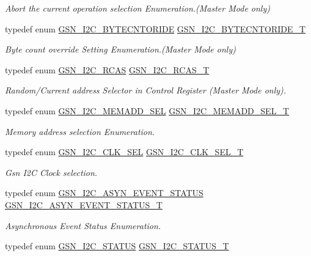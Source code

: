 \begin{DoxyCompactItemize}
\begin{DoxyCompactList}\small\item\em Abort the current operation selection Enumeration.(Master Mode only) \end{DoxyCompactList}\item 
typedef enum \hyperlink{a00649_ga47ecffee533c3e8638337fb1c33feb17}{GSN\_\-I2C\_\-BYTECNTORIDE} \hyperlink{a00649_ga3201b324d6b787d61766a854c7a8702a}{GSN\_\-I2C\_\-BYTECNTORIDE\_\-T}
\begin{DoxyCompactList}\small\item\em Byte count override Setting Enumeration.(Master Mode only) \end{DoxyCompactList}\item 
typedef enum \hyperlink{a00649_ga714a31fb514e9a5d07a62aadef7cc5f8}{GSN\_\-I2C\_\-RCAS} \hyperlink{a00649_ga3e0976c06462690937465a53a0c38cc4}{GSN\_\-I2C\_\-RCAS\_\-T}
\begin{DoxyCompactList}\small\item\em Random/Current address Selector in Control Register (Master Mode only). \end{DoxyCompactList}\item 
typedef enum \hyperlink{a00649_gaad8f0d778e6fcb233fd5644b770b504e}{GSN\_\-I2C\_\-MEMADD\_\-SEL} \hyperlink{a00649_ga3c8e92172b940c58950060ddbccee36d}{GSN\_\-I2C\_\-MEMADD\_\-SEL\_\-T}
\begin{DoxyCompactList}\small\item\em Memory address selection Enumeration. \end{DoxyCompactList}\item 
typedef enum \hyperlink{a00649_gac428b668a257595f28f3daf1789b22ae}{GSN\_\-I2C\_\-CLK\_\-SEL} \hyperlink{a00649_gaced0c2ab1bd7baab4cc105c12ccc1ce0}{GSN\_\-I2C\_\-CLK\_\-SEL\_\-T}
\begin{DoxyCompactList}\small\item\em Gsn I2C Clock selection. \end{DoxyCompactList}\item 
typedef enum \hyperlink{a00649_ga409f34aceadb7ed6f56c6aac57ab4087}{GSN\_\-I2C\_\-ASYN\_\-EVENT\_\-STATUS} \hyperlink{a00649_ga4a73cb21823d744414fed4d0aef5eb3c}{GSN\_\-I2C\_\-ASYN\_\-EVENT\_\-STATUS\_\-T}
\begin{DoxyCompactList}\small\item\em Asynchronous Event Status Enumeration. \end{DoxyCompactList}\item 
typedef enum \hyperlink{a00649_ga4d7ad53afa3985c8d48b6f0de5d44b77}{GSN\_\-I2C\_\-STATUS} \hyperlink{a00649_ga9787fba32c156c866916dc301e5727c8}{GSN\_\-I2C\_\-STATUS\_\-T}

\end{DoxyCompactItemize}

